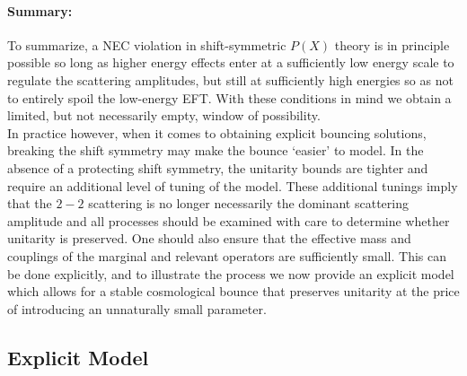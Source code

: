 \documentclass[12pt]{article}
\begin{document}
\paragraph{Summary:} To summarize, a NEC violation in shift-symmetric $P(X)$ theory is in principle possible so long as higher energy effects enter at a sufficiently low energy scale to regulate the scattering amplitudes, but still at sufficiently high energies so as not to entirely spoil the low-energy EFT. With these conditions in mind we obtain a limited, but not necessarily empty, window of possibility. \\

In practice however, when it comes to obtaining explicit bouncing solutions, breaking the shift symmetry may make the bounce `easier' to model. In the absence of a protecting shift symmetry, the unitarity bounds are tighter and require an additional level of tuning of the model. These additional tunings imply that the $2-2$ scattering is no longer necessarily the dominant scattering amplitude and all processes should be examined with care to determine whether unitarity is preserved. One should also ensure that the effective mass and couplings of the marginal and relevant operators are sufficiently small.
%
 This can be done explicitly, and to illustrate the process we now provide an explicit model which allows for a stable cosmological bounce that preserves unitarity at the price of introducing an unnaturally small parameter.

 \subsection{Explicit Model}

\label{Explicitmodel}
\end{document}
